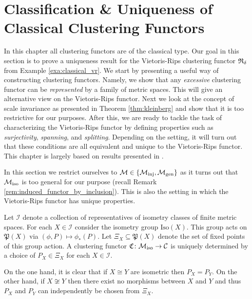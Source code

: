 \chapter{Classification \& Uniqueness of Classical Clustering Functors}
\label{chapter__classical}
In this chapter all clustering functors are of the classical type.
Our goal in this section is to prove a uniqueness result for the Vietoris-Rips clustering functor $\mathfrak{R}_\delta$ from Example \ref{exa:classical_vr}.
%
We start by presenting a useful way of constructing clustering functors. Namely, we show that any \emph{excessive} clustering functor can be \emph{represented} by a family of metric spaces. This will give an alternative view on the Vietoris-Rips functor.
%
Next we look at the concept of scale invariance as presented in Theorem \ref{thm:kleinberg} and show that it is too restrictive for our purposes.
%
After this, we are ready to tackle the task of characterizing the Vietoris-Rips functor by defining properties such as \emph{surjectivity}, \emph{spanning}, and \emph{splitting}. Depending on the setting, it will turn out that these conditions are all equivalent and unique to the Vietoris-Rips functor.
%
This chapter is largely based on results presented in \cite{Carlsson2010}.

In this section we restrict ourselves to $\mathcal{M} \in \{{\mathcal{M}_\mathrm{inj}}, {\mathcal{M}_\mathrm{gen}}\}$ as it turns out that ${\mathcal{M}_\mathrm{iso}}$ is too general for our purpose (recall Remark \ref{rem:induced_functor_by_inclusion}).
This is also the setting in which the Vietoris-Rips functor has unique properties.

\begin{myremark}{\cite[Thm.~6.1]{Carlsson2010}}{}
Let $\mathcal{I}$ denote a collection of representatives of isometry classes of finite metric spaces.
For each $X \in \mathcal{I}$ consider the isometry group $\mathrm{Iso}(X)$.
This group acts on $\mathfrak{P}(X)$ via $(\phi, P) \mapsto \phi_*(P)$.
Let $\Xi_X \subseteq \mathfrak{P}(X)$ denote the set of fixed points of this group action.
A clustering functor $\mathfrak{C}\colon {\mathcal{M}_\mathrm{iso}} \to \mathcal{C}$ is uniquely determined by a choice of $P_X \in \Xi_X$ for each $X \in \mathcal{I}$.

\medskip
On the one hand, it is clear that if $X \cong Y$ are isometric then $P_X = P_Y$. On the other hand, if $X \not\cong Y$ then there exist no morphisms between $X$ and $Y$ and thus $P_X$ and $P_Y$ can independently be chosen from $\Xi_X$.
\end{myremark}


